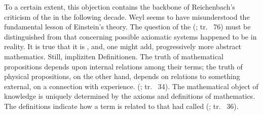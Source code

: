 \documentclass[draft]{article}
\newcommand{\rhp}[2]{(\cite[#1]{Reichenbach1920a}; tr.\ \citeyear{Reichenbach1969} #2)\xspace}
\begin{document}
%
To a certain extent, this objection contains the backbone of Reichenbach's criticism of the \uftp in the following decade. Weyl seems to have misunderstood the fundamental lesson of Einstein's theory. The question of the  \rhp{73}{76} must be distinguished from that concerning possible axiomatic systems happened to be in reality. It is true that it is , and, one might add, progressively more abstract mathematics. Still,  {impliziten Definitionen}. The truth of mathematical propositions depends upon internal relations among their terms; the truth of physical propositions, on the other hand, depends on relations to something external, on a connection with experience.  \rhp{33}{34}. The mathematical object of knowledge is uniquely determined by the axioms and definitions of mathematics. The definitions indicate how a term is related to that \citet{Schlick1918} had called  \rhp{33}{36}. 
\end{document}
